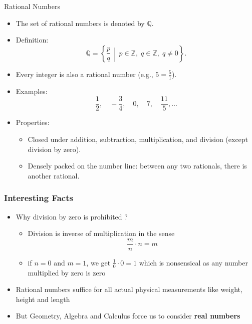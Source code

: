 \documentclass{beamer}
\begin{document}
\begin{frame}{Rational Numbers}
    \begin{itemize}
        \item The set of rational numbers is denoted by \(\mathbb{Q}\).
        \item Definition:
        \[
          \mathbb{Q} = \left\{ \frac{p}{q} \,\middle|\,
            p \in \mathbb{Z}, \; q \in \mathbb{Z}, \; q \neq 0
          \right\}.
        \]
        \item Every integer is also a rational number (e.g., \(5 = \frac{5}{1}\)).
        \item Examples:
        \[
          \frac{1}{2}, \quad -\frac{3}{4}, \quad 0, \quad 7, \quad \frac{11}{5}, \ldots
        \]
        \item Properties:
        \begin{itemize}
            \item Closed under addition, subtraction, multiplication, and division (except division by zero).
            \item Densely packed on the number line: between any two rationals, there is another rational.
        \end{itemize}
    \end{itemize}
\end{frame}
\begin{frame}
    \frametitle{Interesting Facts}
    \begin{itemize} 
        \item Why division by zero is prohibited ?
        \begin{itemize}
            \item Division is inverse of multiplication in the sense  
            \[  
            \frac{m}{n} \cdot n = m
            \]
        \item if \( n=0 \) and \( m = 1\), we get \(\frac{1}{0} \cdot 0 = 1\) which is nonsensical as any number multiplied by zero is zero
        \end{itemize}
        \item Rational numbers suffice for all actual physical measurements like weight, height and length
        \item But Geometry, Algebra and Calculus force us to consider \textbf{real numbers}
    \end{itemize}
\end{frame}
\end{document}

